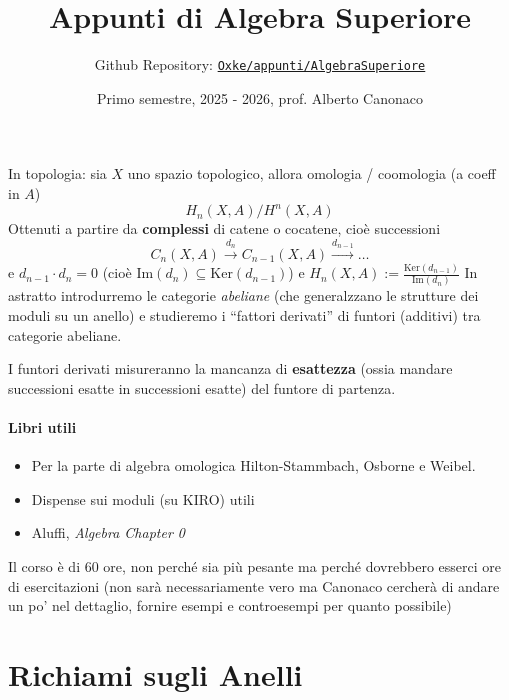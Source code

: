 

\title{Appunti di Algebra Superiore}
\author{Github Repository:
\href{https://github.com/Oxke/appunti/tree/main/AlgebraSuperiore}{\texttt{Oxke/appunti/AlgebraSuperiore}}}

\date{Primo semestre, 2025 \-- 2026, prof. Alberto Canonaco}


\maketitle

In topologia: sia \(X\) uno spazio topologico, allora omologia / coomologia (a
coeff in \(A\)) 
\[
  H_{n}{(X, A)} / H^{n}{(X, A)}
\]
Ottenuti a partire da \textbf{complessi} di catene o cocatene, cioè successioni
\[
    C_{n}{(X, A)} \overset{d_{n}}{\to } C_{n-1} {(X, A)} \overset{d_{n-1} }{\to } \dots
\]
e \(d_{n-1} \cdot d_{n} = 0\) (cioè \(\mathrm {Im} {(d_{n})} \subseteq \mathrm{Ker}{(d_{n-1} )} \))  e \(H_{n} {(X, A)} := \frac{\mathrm{Ker}{(d_{n-1} )}}{\mathrm{Im}{(d_{n})}}\) 
In astratto introdurremo le categorie \emph{abeliane} (che generalzzano le
strutture dei moduli su un anello) e studieremo i ``fattori derivati'' di
funtori (additivi) tra categorie abeliane.

I funtori derivati misureranno la mancanza di \textbf{esattezza} (ossia mandare
successioni esatte in successioni esatte) del funtore di
partenza.

\paragraph{Libri utili}
\begin{itemize}[label = --]
    \item Per la parte di algebra omologica Hilton-Stammbach, Osborne e
Weibel.
    \item Dispense sui moduli (su KIRO) utili
    \item Aluffi, \emph{Algebra Chapter 0}
\end{itemize}
Il corso è di 60 ore, non perché sia più pesante ma perché dovrebbero esserci
ore di esercitazioni (non sarà necessariamente vero ma Canonaco cercherà di
andare un po' nel dettaglio, fornire esempi e controesempi per quanto possibile)


\section{Richiami sugli Anelli}


